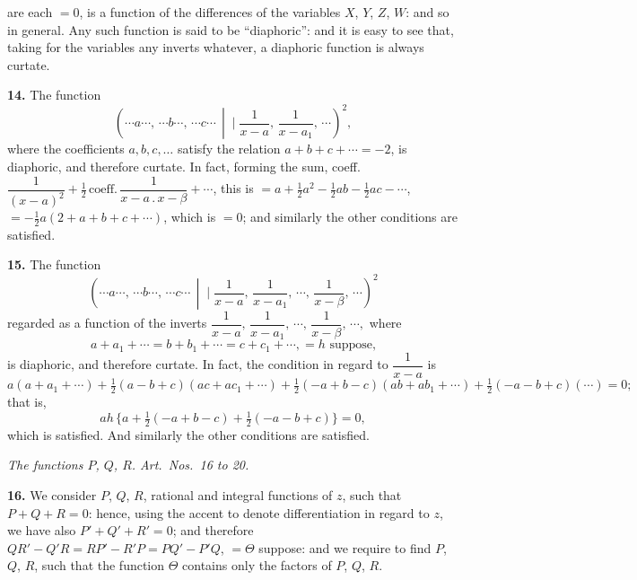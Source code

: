 \documentclass[11pt]{article}
\newcommand{\artno}[1]{\textbf{#1.}\quad}
\begin{document}
\newpage
are each $=0$, is a function of the differences of the variables $X$, $Y$, $Z$, $W$: and so in
general. Any such function is said to be ``diaphoric'': and it is easy to see that,
taking for the variables any inverts whatever, a diaphoric function is always curtate.

\artno{14} The function
\[
   \left(\cdots a \cdots,\,\cdots b \cdots,\,\cdots c \cdots \,\middle|\!\!\!\!\mid \frac{1}{x-a},\,\frac{1}{x-a_{1}},\,\cdots\right)^{\!2},
\]
where the coefficients $a, b, c, \ldots$ satisfy the relation $a + b + c + \cdots = -2$, is diaphoric,
and therefore curtate. In fact, forming the sum, coeff.\ $\dfrac{1}{(x-a)^{2}} + \tfrac{1}{2}\,\text{coeff.}\,\dfrac{1}{x-a\,.\,x-\beta} + \cdots$,
this is $=a + \tfrac{1}{2}a^{2} - \tfrac{1}{2}ab - \tfrac{1}{2}ac - \cdots$, $=-\tfrac{1}{2}a(2 + a + b + c + \cdots)$, which is $=0$; and similarly
the other conditions are satisfied.

\artno{15} The function
\[
   \left(\cdots a \cdots,\,\cdots b \cdots,\,\cdots c \cdots \,\middle|\!\!\!\!\mid \frac{1}{x-a},\,\frac{1}{x-a_{1}},\,\cdots,\,\frac{1}{x-\beta},\,\cdots\right)^{\!2}
\]
regarded as a function of the inverts $\dfrac{1}{x-a},\,\dfrac{1}{x-a_{1}},\,\cdots,\,\dfrac{1}{x-\beta},\,\cdots,$ where
\[
   a + a_{1} + \cdots = b + b_{1} + \cdots = c + c_{1} + \cdots, = h \text{ suppose,}
\]
is diaphoric, and therefore curtate. In fact, the condition in regard to $\dfrac{1}{x-a}$ is
\[
   a(a + a_{1} + \cdots) + \tfrac{1}{2}(a - b + c)(a c + a c_{1} + \cdots) + \tfrac{1}{2}(-a + b - c)(a b + a b_{1} + \cdots) + \tfrac{1}{2}(-a - b + c)(\cdots) = 0;
\]
that is,
\[
   ah\,\{a + \tfrac{1}{2}(-a + b - c) + \tfrac{1}{2}(-a - b + c)\} = 0,
\]
which is satisfied. And similarly the other conditions are satisfied.

\bigskip

\begin{center}
\textit{The functions $P$, $Q$, $R$. Art.\ Nos.\ 16 to 20.}
\end{center}

\medskip

\artno{16} We consider $P$, $Q$, $R$, rational and integral functions of $z$, such that $P + Q + R = 0$:
hence, using the accent to denote differentiation in regard to $z$, we have also $P' + Q' + R' = 0$;
and therefore $QR' - Q'R = RP' - R'P = PQ' - P'Q$, $= \Theta$ suppose: and we require to find
$P$, $Q$, $R$, such that the function $\Theta$ contains only the factors of $P$, $Q$, $R$.
\end{document}
